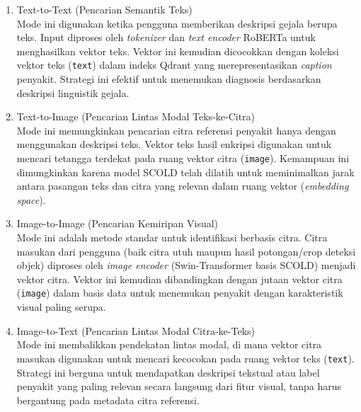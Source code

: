 \begin{enumerate}[nosep]
    \item Text-to-Text (Pencarian Semantik Teks) \\
    Mode ini digunakan ketika pengguna memberikan deskripsi gejala berupa teks. Input diproses oleh \textit{tokenizer} dan \textit{text encoder} RoBERTa untuk menghasilkan vektor teks. Vektor ini kemudian dicocokkan dengan koleksi vektor teks (\texttt{text}) dalam indeks Qdrant yang merepresentasikan \textit{caption} penyakit. Strategi ini efektif untuk menemukan diagnosis berdasarkan deskripsi linguistik gejala.

    \item Text-to-Image (Pencarian Lintas Modal Teks-ke-Citra) \\
    Mode ini memungkinkan pencarian citra referensi penyakit hanya dengan menggunakan deskripsi teks. Vektor teks hasil enkripsi digunakan untuk mencari tetangga terdekat pada ruang vektor citra (\texttt{image}). Kemampuan ini dimungkinkan karena model SCOLD telah dilatih untuk meminimalkan jarak antara pasangan teks dan citra yang relevan dalam ruang vektor (\textit{embedding space}).

    \item Image-to-Image (Pencarian Kemiripan Visual) \\
    Mode ini adalah metode standar untuk identifikasi berbasis citra. Citra masukan dari pengguna (baik citra utuh maupun hasil potongan/crop deteksi objek) diproses oleh \textit{image encoder} (Swin-Transformer basis SCOLD) menjadi vektor citra. Vektor ini kemudian dibandingkan dengan jutaan vektor citra (\texttt{image}) dalam basis data untuk menemukan penyakit dengan karakteristik visual paling serupa.

    \item Image-to-Text (Pencarian Lintas Modal Citra-ke-Teks) \\
    Mode ini membalikkan pendekatan lintas modal, di mana vektor citra masukan digunakan untuk mencari kecocokan pada ruang vektor teks (\texttt{text}). Strategi ini berguna untuk mendapatkan deskripsi tekstual atau label penyakit yang paling relevan secara langsung dari fitur visual, tanpa harus bergantung pada metadata citra referensi.
\end{enumerate}


